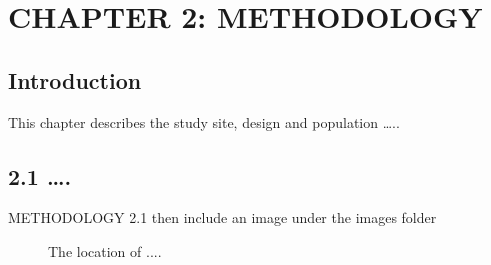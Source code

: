\documentclass[12pt,]{article}
\begin{document}
\setlength{\belowdisplayskip}{0pt}
\setlength{\belowdisplayshortskip}{0pt}
\setlength{\abovedisplayskip}{0pt}
\setlength{\abovedisplayshortskip}{0pt}

\section{CHAPTER 2: METHODOLOGY}\label{chapter-2-methodology}

\subsection{Introduction}\label{introduction}

This chapter describes the study site, design and population \ldots{}..

\subsection{2.1 \ldots{}.}\label{section-5}

METHODOLOGY 2.1 then include an image under the images folder

\begin{figure}[H]
\caption{The location of ....}
\label{fig:figure1Kh}
\end{figure}
\end{document}
